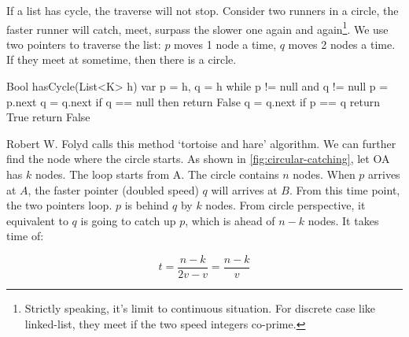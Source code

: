 \documentclass[b5paper]{article}
\begin{document}
\begin{Answer}[ref = {ex:list-others}]
{\begin{center}
\label{fig:circular-list-ans}
\end{center}

If a list has cycle, the traverse will not stop. Consider two runners in a circle, the faster runner will catch, meet, surpass the slower one again and again\footnote{Strictly speaking, it's limit to continuous situation. For discrete case like linked-list, they meet if the two speed integers co-prime.}. We use two pointers to traverse the list: $p$ moves 1 node a time, $q$ moves 2 nodes a time. If they meet at sometime, then there is a circle.

\begin{Bourbaki}
Bool hasCycle(List<K> h) {
    var p = h, q = h
    while p != null and q != null {
        p = p.next
        q = q.next
        if q == null then return False
        q = q.next
        if p == q return True
    }
    return False
}
\end{Bourbaki}

Robert W. Folyd calls this method `tortoise and hare' algorithm. We can further find the node where the circle starts. As shown in \cref{fig:circular-catching}, let OA has $k$ nodes. The loop starts from A. The circle contains $n$ nodes. When $p$ arrives at $A$, the faster pointer (doubled speed) $q$ will arrives at $B$. From this time point, the two pointers loop. $p$ is behind $q$ by $k$ nodes. From circle perspective, it equivalent to $q$ is going to catch up $p$, which is ahead of $n - k$ nodes. It takes time of:

\[
 t = \dfrac{n - k}{2v - v} = \dfrac{n - k}{v}
\]

\begin{center}
\end{center}}
\end{Answer}
\end{document}
